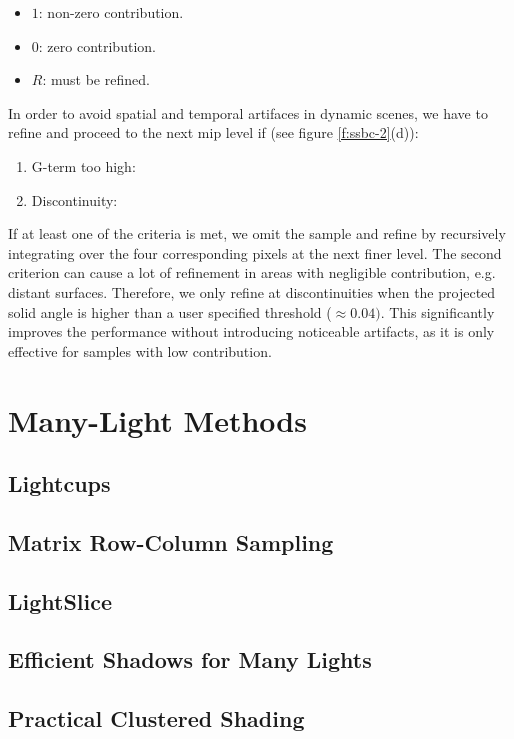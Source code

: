 \begin{itemize}
	\item $1$: non-zero contribution.
	\item $0$: zero contribution.
	\item $R$: must be refined.
\end{itemize}

In order to avoid spatial and temporal artifaces in dynamic scenes, we have to refine and proceed to the next mip level if (see figure \ref{f:ssbc-2}(d)):

\begin{enumerate}
	\item G-term too high: 
	\item Discontinuity: 
\end{enumerate}
 
If at least one of the criteria is met, we omit the sample and refine by recursively integrating over the four corresponding pixels at the next finer level. The second criterion can cause a lot of refinement in areas with negligible contribution, e.g. distant surfaces. Therefore, we only refine at discontinuities when the projected solid angle is higher than a user specified threshold ($\approx 0.04)$. This significantly improves the performance without introducing noticeable artifacts, as it is only effective for samples with low contribution.
 
 


\section{Many-Light Methods}


\subsection{Lightcups}
\subsection{Matrix Row-Column Sampling}
\subsection{LightSlice}
\subsection{Efficient Shadows for Many Lights}
\subsection{Practical Clustered Shading}
